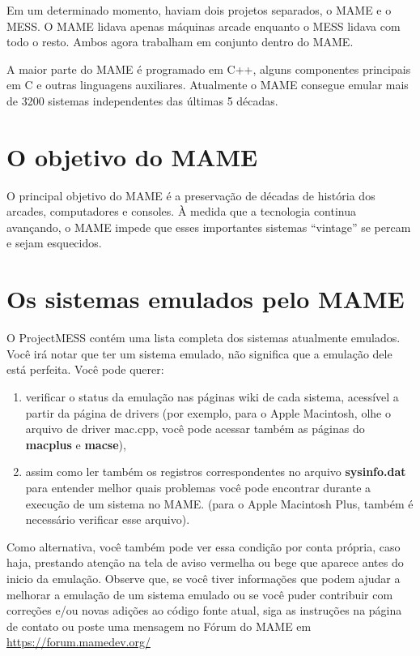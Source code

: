\documentclass[letterpaper,10pt,brazil]{sphinxmanual}
\begin{document}
Em um determinado momento, haviam dois projetos separados, o MAME e o
MESS. O MAME lidava apenas máquinas arcade enquanto o MESS lidava com
todo o resto. Ambos agora trabalham em conjunto dentro do MAME.

A maior parte do MAME é programado em C++, alguns componentes principais
em C e outras linguagens auxiliares. Atualmente o MAME consegue emular
mais de 3200 sistemas independentes das últimas 5 décadas.


\section{O objetivo do MAME}
\label{initialsetup/mameintro:o-objetivo-do-mame}
O principal objetivo do MAME é a preservação de décadas de história dos
arcades, computadores e consoles. À medida que a tecnologia continua
avançando, o MAME impede que esses importantes sistemas “vintage” se
percam e sejam esquecidos.


\section{Os sistemas emulados pelo MAME}
\label{initialsetup/mameintro:os-sistemas-emulados-pelo-mame}
O ProjectMESS contém uma lista completa dos sistemas atualmente
emulados. Você irá notar que ter um sistema emulado, não significa que
a emulação dele está perfeita. Você pode querer:
\begin{enumerate}
\item {} 
verificar o status da emulação nas páginas wiki de cada sistema,
acessível a partir da página de drivers (por exemplo, para o Apple
Macintosh, olhe o arquivo de driver mac.cpp, você pode acessar também
as páginas do \textbf{macplus} e \textbf{macse}),

\item {} 
assim como ler também os registros correspondentes no arquivo
\textbf{sysinfo.dat} para entender melhor quais problemas você pode
encontrar durante a execução de um sistema no MAME. (para o Apple
Macintosh Plus, também é necessário verificar esse arquivo).

\end{enumerate}

Como alternativa, você também pode ver essa condição por conta própria,
caso haja, prestando atenção na tela de aviso vermelha ou bege que
aparece antes do inicio da emulação. Observe que, se você tiver
informações que podem ajudar a melhorar a emulação de um sistema emulado
ou se você puder contribuir com correções e/ou novas adições ao código
fonte atual, siga as instruções na página de contato ou poste uma
mensagem no Fórum do MAME em \url{https://forum.mamedev.org/}
\end{document}
